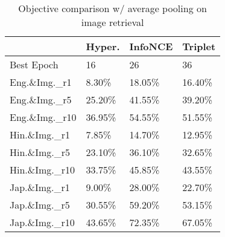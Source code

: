 
\begin{table}
    \centering
\begin{tabular}{llll}
\toprule
{} & Hyper. & InfoNCE & Triplet \\
\midrule
Best Epoch          &                   16 &                      26 &                        36 \\
Eng.\&Img.\_r1  &                8.30\% &                  18.05\% &                    16.40\% \\
Eng.\&Img.\_r5  &                25.20\%&                  41.55\% &                    39.20\% \\
Eng.\&Img.\_r10 &                36.95\% &                  54.55\% &                    51.55\% \\
\midrule
Hin.\&Img.\_r1  &                 7.85\% &                  14.70\% &                    12.95\% \\
Hin.\&Img.\_r5  &                23.10\% &                  36.10\% &                    32.65\% \\
Hin.\&Img.\_r10 &                33.75\%&                  45.85\% &                    43.55\% \\
\midrule
Jap.\&Img.\_r1  &                9.00\% &                  28.00\% &                    22.70\% \\
Jap.\&Img.\_r5  &                30.55\%&                  59.20\% &                    53.15\% \\
Jap.\&Img.\_r10 &                43.65\%&                  72.35\% &                    67.05\% \\
\bottomrule
\end{tabular}

\caption{Objective comparison  w/ average pooling on image retrieval}
\label{table:Objective_img_ret}
\end{table}
